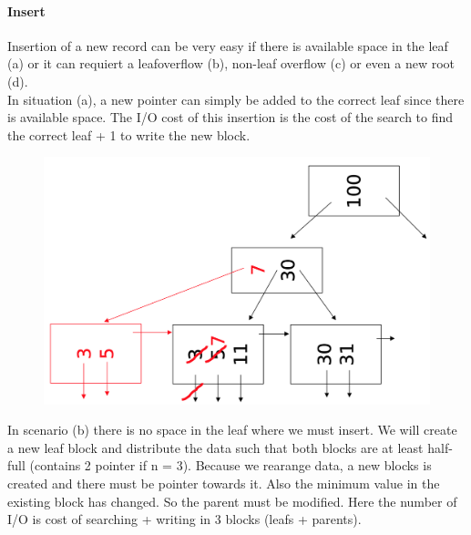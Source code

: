 \documentclass[12pt,a4paper]{article}
\begin{document}
\paragraph{Insert}
Insertion of a new record can be very easy if there is available space in the leaf (a) or it can requiert a leafoverflow (b), non-leaf overflow (c) or even a new root (d).\\
In situation (a), a new pointer can simply be added to the correct leaf since there is available space. The I/O cost of this insertion is the cost of the search to find the correct leaf + 1 to write the new block.\\

\begin{figure}
\vspace{-5mm}
\includegraphics[scale=0.25]{img/img37.png}
\end{figure}
In scenario (b) there is no space in the leaf where we must insert. We will create a new leaf block and distribute the data such that both blocks are at least half-full (contains 2 pointer if n = 3). Because we rearange data, a new blocks is created and there must be pointer towards it. Also the minimum value in the existing block has changed. So the parent must be modified. Here the number of I/O is cost of searching + writing in 3 blocks (leafs + parents).\\
\end{document}
